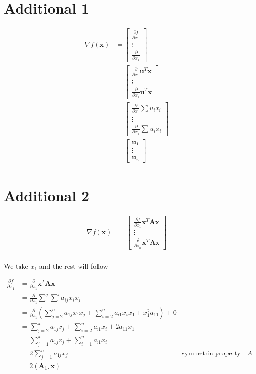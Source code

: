 \documentclass{article}
\newcommand{\vect}[1]{\boldsymbol{#1}}
\begin{document}
\section*{Additional 1}
\begin{align*}
  \nabla f(\vect{x}) &=
  \begin{bmatrix}
    \frac{\partial f}{\partial x_1} \\
    \vdots \\
    \frac{\partial}{\partial x_n}
  \end{bmatrix} \\
  &=
  \begin{bmatrix}
    \frac{\partial}{\partial x_1} \vect u^T \vect x\\
    \vdots \\
    \frac{\partial}{\partial x_n} \vect u^T \vect x
  \end{bmatrix} \\
  &=
  \begin{bmatrix}
	\frac{\partial}{\partial x_1} \sum u_i x_i\\
	\vdots \\
	\frac{\partial}{\partial x_n} \sum u_i x_i
  \end{bmatrix} \\
  &= \begin{bmatrix}
	\vect u_1 \\
	\vdots \\
	\vect u_n
  \end{bmatrix} \\
\end{align*}
\section*{Additional 2}

\begin{align*}
	  \nabla f(\vect{x}) &=
  \begin{bmatrix}
	\frac{\partial f}{\partial x_1} \vect x^T \vect A \vect x \\
	\vdots \\
	\frac{\partial}{\partial x_n}\vect x^T \vect A \vect x
  \end{bmatrix} \\
\end{align*}

We take \(x_1\) and the rest will follow

\begin{align*}
	  \frac{\partial f}{\partial x_1} &= \frac{\partial}{\partial x_1} \vect x^T \vect A \vect x \\
  &= \frac{\partial}{\partial x_1} \sum^j\sum^i a_{ij}x_ix_j \\ 
  &= \frac{\partial}{\partial x_1}(\sum_{j=2}^n a_{1j}x_1x_j + \sum_{i=2}^n a_{i1}x_ix_1 + x_1^2a_{11}) + 0\\
  &= \sum_{j=2}^n a_{1j}x_j + \sum_{i=2}^n a_{i1}x_i + 2a_{11}x_1\\
  &= \sum_{j=1}^n a_{1j}x_j + \sum_{i=1}^n a_{i1}x_i\\
  &= 2\sum_{j=1}^n a_{1j}x_j & \text{symmetric property of } A\\
  &= 2(\vect A_{1\cdot} \vect x)
\end{align*}
\end{document}
